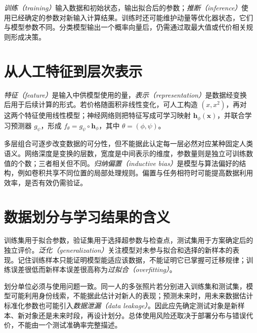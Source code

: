 \emph{训练（training）}输入数据和初始状态，输出拟合后的参数；\emph{推断（inference）}使用已经确定的参数对新输入计算结果。训练时还可能维护动量等优化器状态，它们与模型参数不同。分类模型输出一个概率向量后，仍需通过取最大值或代价相关规则形成决策。

\section{从人工特征到层次表示}
\emph{特征（feature）}是输入中供模型使用的量，\emph{表示（representation）}是数据经变换后用于后续计算的形式。若价格随面积非线性变化，可人工构造 $(x,x^2)$，再对这两个特征使用线性模型；神经网络则把特征写成可学习映射 $\mathbf h_\phi(\mathbf x)$，并联合学习预测器 $g_\psi$，形成 $f_\theta=g_\psi\circ\mathbf h_\phi$，其中 $\theta=(\phi,\psi)$。

多层组合可逐步改变数据的可分性，但不能据此认定每一层必然对应某种固定人类语义。网络深度是变换的层数，宽度是中间表示的维度，参数量则是独立可训练数值的个数；三者相关但不同。\emph{归纳偏置（inductive bias）}是模型与算法偏好的结构，例如卷积共享不同位置的局部处理规则。偏置与任务相符时可能提高数据利用效率，是否有效仍需验证。

\section{数据划分与学习结果的含义}
训练集用于拟合参数，验证集用于选择超参数与检查点，测试集用于方案确定后的独立评价。\emph{泛化（generalization）}关注模型对未参与拟合和选择的新样本的表现。记住训练样本只能证明模型能适应该数据，不能证明它已掌握可迁移规律；训练误差很低而新样本误差很高称为\emph{过拟合（overfitting）}。

划分单位必须与使用问题一致。同一人的多张照片若分别进入训练集和测试集，模型可能利用身份线索，不能据此估计对新人的表现；预测未来时，用未来数据估计标准化参数也可能引入\emph{数据泄漏（data leakage）}。因此应先确定测试对象是新样本、新对象还是未来时段，再设计划分。总体使用风险还取决于部署分布与错误代价，不能由一个测试准确率完整描述。


